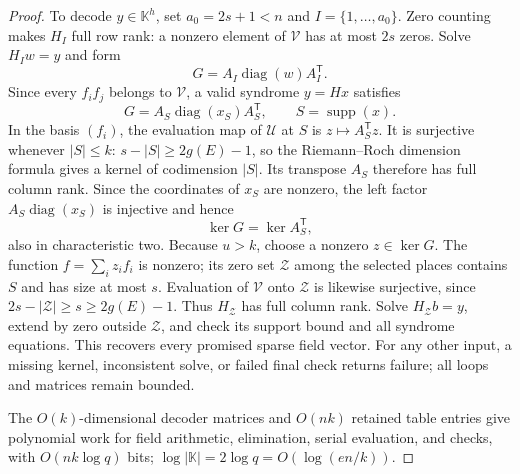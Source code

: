 \documentclass[11pt,letterpaper]{article}
\numberwithin{equation}{section}
\DeclareMathOperator{\supp}{supp}
\begin{document}
\begin{proof}
To decode $y\in \mathbb K^h$, set $a_0=2s+1<n$ and $I=\{1,\ldots,a_0\}$.
Zero counting makes $H_I$ full row rank: a nonzero element of $\mathcal V$ has at most $2s$ zeros.
Solve $H_Iw=y$ and form
\begin{equation}
G=A_I\operatorname{diag}(w)A_I^{\mathsf T}.
                                                               \label{eq:b11}
\end{equation}
Since every $f_if_j$ belongs to $\mathcal V$, a valid syndrome $y=Hx$ satisfies
\begin{equation}
G=A_S\operatorname{diag}(x_S)A_S^{\mathsf T},
            \qquad S=\supp(x).            \label{eq:b12}
\end{equation}
In the basis $(f_i)$, the evaluation map of $\mathcal U$ at $S$ is $z\mapsto A_S^{\mathsf T}z$.
It is surjective whenever $|S|\le k$: $s-|S|\ge2g(E)-1$, so the Riemann--Roch dimension formula gives a kernel of codimension $|S|$.
Its transpose $A_S$ therefore has full column rank.
Since the coordinates of $x_S$ are nonzero, the left factor $A_S\operatorname{diag}(x_S)$ is injective and hence
\begin{equation}
\ker G=\ker A_S^{\mathsf T},        \label{eq:b13}
\end{equation}
also in characteristic two.
Because $u>k$, choose a nonzero $z\in\ker G$.
The function $f=\sum_i z_if_i$ is nonzero; its zero set $\mathcal Z$ among the selected places contains $S$ and has size at most $s$.
Evaluation of $\mathcal V$ onto $\mathcal Z$ is likewise surjective, since $2s-|\mathcal Z|\ge s\ge2g(E)-1$.
Thus $H_{\mathcal Z}$ has full column rank.
Solve $H_{\mathcal Z}b=y$, extend by zero outside $\mathcal Z$, and check its support bound and all syndrome equations.
This recovers every promised sparse field vector.
For any other input, a missing kernel, inconsistent solve, or failed final check returns failure; all loops and matrices remain bounded.

The $O(k)$-dimensional decoder matrices and $O(nk)$ retained table entries give polynomial work for field arithmetic, elimination, serial evaluation, and checks, with $O(nk\log q)$ bits; $\log|\mathbb K|=2\log q=O(\log(en/k))$.
\end{proof}
\end{document}
